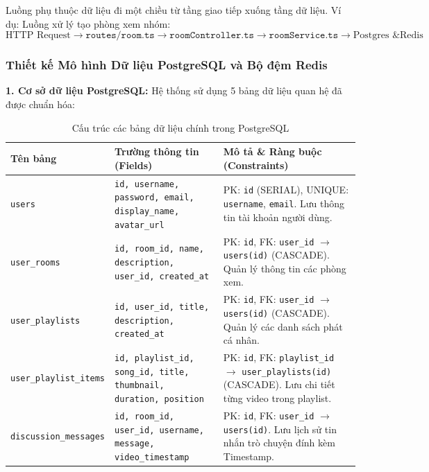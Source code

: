 \documentclass[12pt,a4paper]{extarticle}
\begin{document}
Luồng phụ thuộc dữ liệu đi một chiều từ tầng giao tiếp xuống tầng dữ liệu. Ví dụ: Luồng xử lý tạo phòng xem nhóm:
$$\text{HTTP Request} \xrightarrow{} \texttt{routes/room.ts} \xrightarrow{} \texttt{roomController.ts} \xrightarrow{} \texttt{roomService.ts} \xrightarrow{} \text{Postgres \& Redis}$$


\subsubsection{Thiết kế Mô hình Dữ liệu PostgreSQL và Bộ đệm Redis}

\textbf{1. Cơ sở dữ liệu PostgreSQL:} Hệ thống sử dụng 5 bảng dữ liệu quan hệ đã được chuẩn hóa:

\begin{table}[H]
\centering
\small
\caption{Cấu trúc các bảng dữ liệu chính trong PostgreSQL}
\label{tab:db_schema_detail}
\renewcommand{\arraystretch}{1.3}
\begin{tabular}{|l|p{5cm}|p{6.8cm}|}
\hline
\textbf{Tên bảng} & \textbf{Trường thông tin (Fields)} & \textbf{Mô tả \& Ràng buộc (Constraints)} \\ \hline
\texttt{users} & \texttt{id, username, password, email, display\_name, avatar\_url} & PK: \texttt{id} (SERIAL), UNIQUE: \texttt{username}, \texttt{email}. Lưu thông tin tài khoản người dùng. \\ \hline
\texttt{user\_rooms} & \texttt{id, room\_id, name, description, user\_id, created\_at} & PK: \texttt{id}, FK: \texttt{user\_id} $\rightarrow$ \texttt{users(id)} (CASCADE). Quản lý thông tin các phòng xem. \\ \hline
\texttt{user\_playlists} & \texttt{id, user\_id, title, description, created\_at} & PK: \texttt{id}, FK: \texttt{user\_id} $\rightarrow$ \texttt{users(id)} (CASCADE). Quản lý các danh sách phát cá nhân. \\ \hline
\texttt{user\_playlist\_items} & \texttt{id, playlist\_id, song\_id, title, thumbnail, duration, position} & PK: \texttt{id}, FK: \texttt{playlist\_id} $\rightarrow$ \texttt{user\_playlists(id)} (CASCADE). Lưu chi tiết từng video trong playlist. \\ \hline
\texttt{discussion\_messages} & \texttt{id, room\_id, user\_id, username, message, video\_timestamp} & PK: \texttt{id}, FK: \texttt{user\_id} $\rightarrow$ \texttt{users(id)}. Lưu lịch sử tin nhắn trò chuyện đính kèm Timestamp. \\ \hline
\end{tabular}
\end{table}
\end{document}
